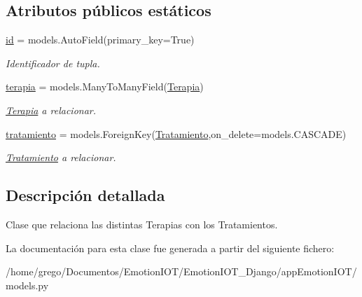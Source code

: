 \subsection*{Atributos públicos estáticos}
\begin{DoxyCompactItemize}
\item 
\hyperlink{classappEmotionIOT_1_1models_1_1Terapia__Tratamiento_a19cd7f4de95f115d9e9aba4d74a9c1bd}{id} = models.\+Auto\+Field(primary\+\_\+key=True)\hypertarget{classappEmotionIOT_1_1models_1_1Terapia__Tratamiento_a19cd7f4de95f115d9e9aba4d74a9c1bd}{}\label{classappEmotionIOT_1_1models_1_1Terapia__Tratamiento_a19cd7f4de95f115d9e9aba4d74a9c1bd}

\begin{DoxyCompactList}\small\item\em Identificador de tupla. \end{DoxyCompactList}\item 
\hyperlink{classappEmotionIOT_1_1models_1_1Terapia__Tratamiento_a6af22ff8281728a95141f5237a1ad930}{terapia} = models.\+Many\+To\+Many\+Field(\hyperlink{classappEmotionIOT_1_1models_1_1Terapia}{Terapia})\hypertarget{classappEmotionIOT_1_1models_1_1Terapia__Tratamiento_a6af22ff8281728a95141f5237a1ad930}{}\label{classappEmotionIOT_1_1models_1_1Terapia__Tratamiento_a6af22ff8281728a95141f5237a1ad930}

\begin{DoxyCompactList}\small\item\em \hyperlink{classappEmotionIOT_1_1models_1_1Terapia}{Terapia} a relacionar. \end{DoxyCompactList}\item 
\hyperlink{classappEmotionIOT_1_1models_1_1Terapia__Tratamiento_ac12d9d4d165d2cf641a0c8a3ec82f093}{tratamiento} = models.\+Foreign\+Key(\hyperlink{classappEmotionIOT_1_1models_1_1Tratamiento}{Tratamiento},on\+\_\+delete=models.\+C\+A\+S\+C\+A\+DE)\hypertarget{classappEmotionIOT_1_1models_1_1Terapia__Tratamiento_ac12d9d4d165d2cf641a0c8a3ec82f093}{}\label{classappEmotionIOT_1_1models_1_1Terapia__Tratamiento_ac12d9d4d165d2cf641a0c8a3ec82f093}

\begin{DoxyCompactList}\small\item\em \hyperlink{classappEmotionIOT_1_1models_1_1Tratamiento}{Tratamiento} a relacionar. \end{DoxyCompactList}\end{DoxyCompactItemize}


\subsection{Descripción detallada}
Clase que relaciona las distintas Terapias con los Tratamientos. 

La documentación para esta clase fue generada a partir del siguiente fichero\+:\begin{DoxyCompactItemize}
\item 
/home/grego/\+Documentos/\+Emotion\+I\+O\+T/\+Emotion\+I\+O\+T\+\_\+\+Django/app\+Emotion\+I\+O\+T/models.\+py\end{DoxyCompactItemize}
